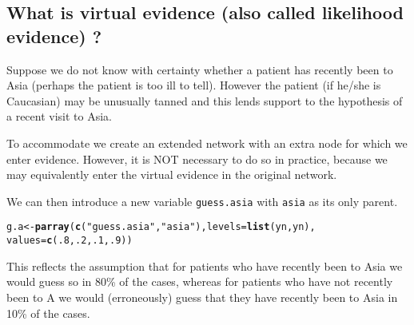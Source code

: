 \documentclass[10pt]{article}\usepackage[]{graphicx}\usepackage[]{color}
\makeatletter
\newcommand{\hlnum}[1]{\textcolor[rgb]{0.686,0.059,0.569}{#1}}%
\newcommand{\hlstr}[1]{\textcolor[rgb]{0.192,0.494,0.8}{#1}}%
\newcommand{\hlstd}[1]{\textcolor[rgb]{0.345,0.345,0.345}{#1}}%
\newcommand{\hlkwb}[1]{\textcolor[rgb]{0.69,0.353,0.396}{#1}}%
\newcommand{\hlkwc}[1]{\textcolor[rgb]{0.333,0.667,0.333}{#1}}%
\newcommand{\hlkwd}[1]{\textcolor[rgb]{0.737,0.353,0.396}{\textbf{#1}}}%
\newenvironment{kframe}{%
 \def\at@end@of@kframe{}%
 \ifinner\ifhmode%
  \def\at@end@of@kframe{\end{minipage}}%
  \begin{minipage}{\columnwidth}%
 \fi\fi%
 \def\FrameCommand##1{\hskip\@totalleftmargin \hskip-\fboxsep
 \colorbox{shadecolor}{##1}\hskip-\fboxsep
     \hskip-\linewidth \hskip-\@totalleftmargin \hskip\columnwidth}%
 \MakeFramed {\advance\hsize-\width
   \@totalleftmargin\z@ \linewidth\hsize
   \@setminipage}}%
 {\par\unskip\endMakeFramed%
 \at@end@of@kframe}
\newenvironment{knitrout}{}{} %
\def\code#1{{\texttt{#1}}}
\makeatother
\begin{document}
\subsection{What is virtual evidence (also called likelihood evidence)
?}
\label{sec:virt-evid-likel}

Suppose we do not know with certainty whether a patient has
recently been to Asia (perhaps the patient is too ill to
tell). However the patient (if he/she is Caucasian) may be unusually
tanned and this lends support to the hypothesis of a recent visit to
Asia.

To accommodate we create an extended network with an extra
node for which we enter evidence.  However, it is NOT necessary to do
so in practice, because we may equivalently enter the virtual evidence
in the original network.

We can then introduce a new variable
\code{guess.asia} with \code{asia} as its only parent.

\begin{knitrout}
\color{fgcolor}\begin{kframe}
\begin{alltt}
\hlstd{g.a} \hlkwb{<-} \hlkwd{parray}\hlstd{(}\hlkwd{c}\hlstd{(}\hlstr{"guess.asia"}\hlstd{,} \hlstr{"asia"}\hlstd{),} \hlkwc{levels}\hlstd{=}\hlkwd{list}\hlstd{(yn, yn),}
              \hlkwc{values}\hlstd{=}\hlkwd{c}\hlstd{(}\hlnum{.8}\hlstd{,}\hlnum{.2}\hlstd{,} \hlnum{.1}\hlstd{,}\hlnum{.9}\hlstd{))}
\end{alltt}
\end{kframe}
\end{knitrout}

This reflects the assumption that for patients who have recently been
to Asia we would guess so in 80\% of the cases, whereas for patients who have
not recently been to A we would (erroneously) guess that they have
recently been to Asia in 10\% of the cases.
\end{document}
